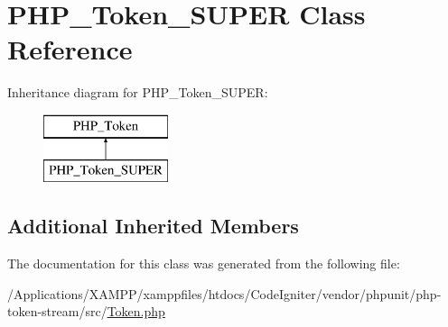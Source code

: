 \hypertarget{class_p_h_p___token___s_u_p_e_r}{}\section{P\+H\+P\+\_\+\+Token\+\_\+\+S\+U\+P\+ER Class Reference}
\label{class_p_h_p___token___s_u_p_e_r}
Inheritance diagram for P\+H\+P\+\_\+\+Token\+\_\+\+S\+U\+P\+ER\+:\begin{figure}[H]
\begin{center}
\leavevmode
\includegraphics[height=2.000000cm]{class_p_h_p___token___s_u_p_e_r}
\end{center}
\end{figure}
\subsection*{Additional Inherited Members}


The documentation for this class was generated from the following file\+:\begin{DoxyCompactItemize}
\item 
/\+Applications/\+X\+A\+M\+P\+P/xamppfiles/htdocs/\+Code\+Igniter/vendor/phpunit/php-\/token-\/stream/src/\mbox{\hyperlink{_token_8php}{Token.\+php}}\end{DoxyCompactItemize}
